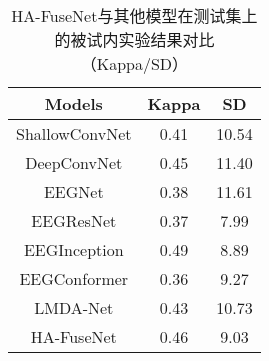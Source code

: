 \begin{table}[ht]
    \centering
    \caption{HA-FuseNet与其他模型在测试集上的被试内实验结果对比（Kappa/SD）}
    \label{tab:2bcompareinsd}
    \begin{tabularx}{\textwidth}{CCC}
      \toprule
      Models & Kappa & SD \\
      \midrule
      ShallowConvNet\cite{schirrmeister2017deep} &0.41&10.54\\
      DeepConvNet\cite{schirrmeister2017deep} &0.45&11.40\\
      EEGNet\cite{lawhern2018eegnet} &0.38& 11.61\\
      EEGResNet\cite{HBM:HBM23730} &0.37&7.99\\
      EEGInception\cite{zhang2021eeg} &0.49&8.89\\
      EEGConformer\cite{song2022eeg} &0.36&9.27\\
      LMDA-Net\cite{miao2023lmda} &0.43&10.73\\
      \midrule 
      HA-FuseNet &0.46&9.03\\
      \bottomrule
    \end{tabularx}
\end{table}



